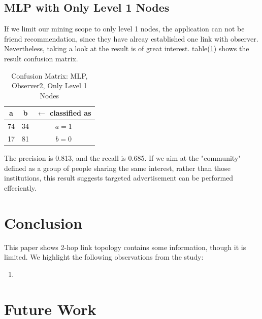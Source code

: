 \documentclass[11pt,a4paper]{article}
\begin{document}
\subsection{MLP with Only Level 1 Nodes}

If we limit our mining scope to only level 1 nodes, 
the application can not be friend recommendation, since 
they have alreay established one link with observer. 
Nevertheless, taking a look at the result is of great interest. 
table(\ref{tbl:cm_o2_l1}) shows the result confusion matrix. 

\begin{table}[htb]
	\centering
	\caption{Confusion Matrix: MLP, Observer2, Only Level 1 Nodes}
	\label{tbl:cm_o2_l1}
	\begin{tabular}{cc|c}
	\hline
a & b & \textbf{$\leftarrow$ classified as}\\	
	\hline
 74 &34 &    $a = 1$\\
  17 &81 &    $b = 0$\\
	\hline
	\end{tabular}
\end{table}

The precision is 0.813, and the recall is 0.685. 
If we aim at the "community" defined as a group 
of people sharing the same interest, rather than 
those institutions, this result suggests targeted 
advertisement can be performed effeciently. 


\section{Conclusion}

This paper shows 2-hop link topology contains some information, 
though it is limited. We highlight the following 
observations from the study:
\begin{enumerate}
	\item 
\end{enumerate}

\section{Future Work}
\end{document}
